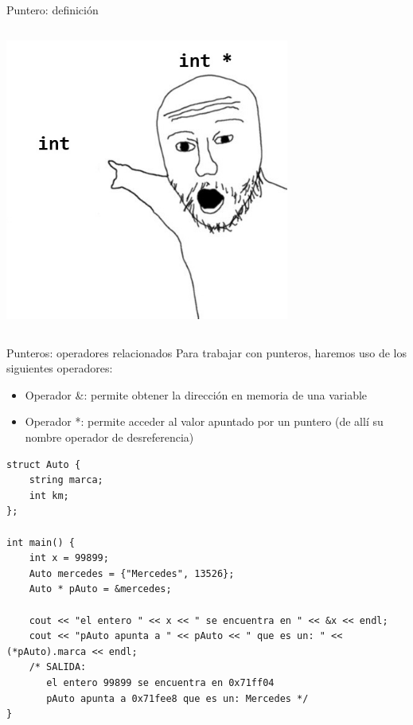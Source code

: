 \documentclass[12pt]{beamer}
\begin{document}
\begin{frame}[fragile]{Puntero: definición}
\begin{columns}
\begin{column}{0.3\textwidth}
            \medskip
            \includegraphics[width=0.7\textwidth]{puntero_meme.jpg}
        \end{column}
    \end{columns}
\end{frame}

\begin{frame}[fragile]{Punteros: operadores relacionados}
    Para trabajar con punteros, haremos uso de los siguientes operadores:
    \begin{itemize}
        \item Operador \alert{\&}: permite obtener la dirección en memoria de una variable
        \item Operador \alert{*}: permite acceder al valor apuntado por un puntero (de allí su nombre operador de desreferencia)
    \end{itemize}
\begin{lstlisting}[basicstyle=\tiny]
struct Auto {
	string marca;
	int km;
};

int main() {
	int x = 99899;
	Auto mercedes = {"Mercedes", 13526};
	Auto * pAuto = &mercedes;
	
	cout << "el entero " << x << " se encuentra en " << &x << endl;
	cout << "pAuto apunta a " << pAuto << " que es un: " << (*pAuto).marca << endl;
	/* SALIDA:
	   el entero 99899 se encuentra en 0x71ff04
	   pAuto apunta a 0x71fee8 que es un: Mercedes */
}
\end{lstlisting}
\end{frame}
\end{document}
